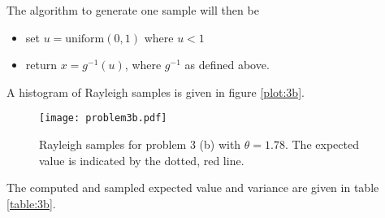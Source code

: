 \documentclass[a4paper,english,12pt]{article}
\begin{document}
The algorithm to generate one sample will then be
\begin{itemize}
  \item set $u = \mathrm{uniform}(0,1)$ where $u<1$
  \item return $x = g^{-1}(u)$, where $g^{-1}$ as defined above.
\end{itemize}

A histogram of Rayleigh samples is given in figure \vref{plot:3b}.
\begin{figure}
  \centering
  \texttt{[image: problem3b.pdf]}
  \caption{Rayleigh samples for problem 3 (b) with $\theta=1.78$. The expected
  value is indicated by the dotted, red line.}
  \label{plot:3b}
\end{figure}
The computed and sampled expected value and variance are given in table
\vref{table:3b}.





\end{document}
